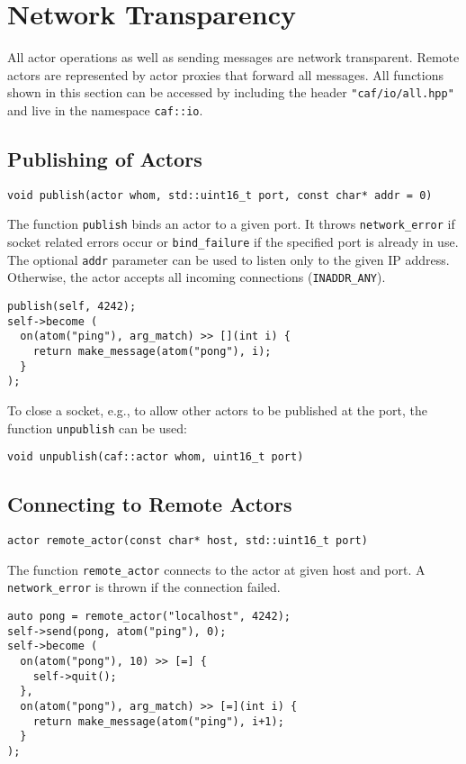\section{Network Transparency}

All actor operations as well as sending messages are network transparent.
Remote actors are represented by actor proxies that forward all messages.
All functions shown in this section can be accessed by including the header \lstinline^"caf/io/all.hpp"^ and live in the namespace \lstinline^caf::io^.

\subsection{Publishing of Actors}

\begin{lstlisting}
void publish(actor whom, std::uint16_t port, const char* addr = 0)
\end{lstlisting}

The function \lstinline^publish^ binds an actor to a given port.
It throws \lstinline^network_error^ if socket related errors occur or \lstinline^bind_failure^ if the specified port is already in use.
The optional \lstinline^addr^ parameter can be used to listen only to the given IP address.
Otherwise, the actor accepts all incoming connections (\lstinline^INADDR_ANY^).

\begin{lstlisting}
publish(self, 4242);
self->become (
  on(atom("ping"), arg_match) >> [](int i) {
    return make_message(atom("pong"), i);
  }
);
\end{lstlisting}

To close a socket, e.g., to allow other actors to be published at the port, the function \lstinline^unpublish^ can be used:

\begin{lstlisting}
void unpublish(caf::actor whom, uint16_t port)
\end{lstlisting}

\subsection{Connecting to Remote Actors}

\begin{lstlisting}
actor remote_actor(const char* host, std::uint16_t port)
\end{lstlisting}

The function \lstinline^remote_actor^ connects to the actor at given host and port.
A \lstinline^network_error^ is thrown if the connection failed.

\begin{lstlisting}
auto pong = remote_actor("localhost", 4242);
self->send(pong, atom("ping"), 0);
self->become (
  on(atom("pong"), 10) >> [=] {
    self->quit();
  },
  on(atom("pong"), arg_match) >> [=](int i) {
    return make_message(atom("ping"), i+1);
  }
);
\end{lstlisting}
